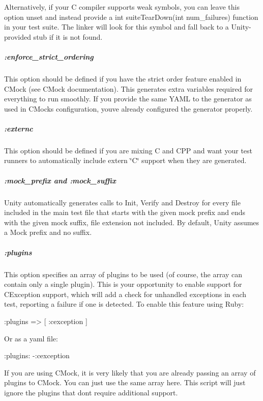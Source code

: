 Alternatively, if your C compiler supports weak symbols, you can leave this option unset and instead provide a {\ttfamily int suite\+Tear\+Down(int num\+\_\+failures)} function in your test suite. The linker will look for this symbol and fall back to a Unity-\/provided stub if it is not found.

\subparagraph*{{\ttfamily \+:enforce\+\_\+strict\+\_\+ordering}}

This option should be defined if you have the strict order feature enabled in C\+Mock (see C\+Mock documentation). This generates extra variables required for everything to run smoothly. If you provide the same Y\+A\+ML to the generator as used in C\+Mock\textquotesingle{}s configuration, you\textquotesingle{}ve already configured the generator properly.

\subparagraph*{{\ttfamily \+:externc}}

This option should be defined if you are mixing C and C\+PP and want your test runners to automatically include extern \char`\"{}\+C\char`\"{} support when they are generated.

\subparagraph*{{\ttfamily \+:mock\+\_\+prefix} and {\ttfamily \+:mock\+\_\+suffix}}

Unity automatically generates calls to Init, Verify and Destroy for every file included in the main test file that starts with the given mock prefix and ends with the given mock suffix, file extension not included. By default, Unity assumes a {\ttfamily Mock} prefix and no suffix.

\subparagraph*{{\ttfamily \+:plugins}}

This option specifies an array of plugins to be used (of course, the array can contain only a single plugin). This is your opportunity to enable support for C\+Exception support, which will add a check for unhandled exceptions in each test, reporting a failure if one is detected. To enable this feature using Ruby\+:


\begin{DoxyCode}
:plugins => [ :cexception ]
\end{DoxyCode}


Or as a yaml file\+:


\begin{DoxyCode}
:plugins:
  -:cexception
\end{DoxyCode}


If you are using C\+Mock, it is very likely that you are already passing an array of plugins to C\+Mock. You can just use the same array here. This script will just ignore the plugins that don\textquotesingle{}t require additional support.

